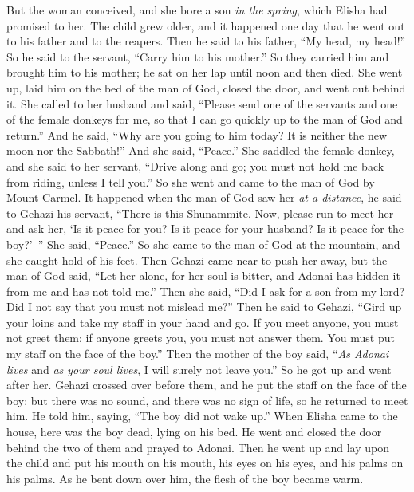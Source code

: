 \begin{biblechapter}
\verse But the woman conceived, and she bore a son \textit{in the spring}, which Elisha had promised to her.
 The child grew older, and it happened one day that he went out to his father and to the reapers.
\verse Then he said to his father, “My head, my head!” So he said to the servant, “Carry him to his mother.”
\verse So they carried him and brought him to his mother; he sat on her lap until noon and then died.
\verse She went up, laid him on the bed of the man of God, closed the door, and went out behind it.
\verse She called to her husband and said, “Please send one of the servants and one of the female donkeys for me, so that I can go quickly up to the man of God and return.”
\verse And he said, “Why are you going to him today? It is neither the new moon nor the Sabbath!” And she said, “Peace.”
\verse She saddled the female donkey, and she said to her servant, “Drive along and go; you must not hold me back from riding, unless I tell you.”
\verse So she went and came to the man of God by Mount Carmel. It happened when the man of God saw her \textit{at a distance}, he said to Gehazi his servant, “There is this Shunammite.
\verse Now, please run to meet her and ask her, ‘Is it peace for you? Is it peace for your husband? Is it peace for the boy?’ ” She said, “Peace.”
\verse So she came to the man of God at the mountain, and she caught hold of his feet. Then Gehazi came near to push her away, but the man of God said, “Let her alone, for her soul is bitter, and Adonai has hidden it from me and has not told me.”
\verse Then she said, “Did I ask for a son from my lord? Did I not say that you must not mislead me?”
\verse Then he said to Gehazi, “Gird up your loins and take my staff in your hand and go. If you meet anyone, you must not greet them; if anyone greets you, you must not answer them. You must put my staff on the face of the boy.”
\verse Then the mother of the boy said, “\textit{As Adonai lives} and \textit{as your soul lives}, I will surely not leave you.” So he got up and went after her.
\verse Gehazi crossed over before them, and he put the staff on the face of the boy; but there was no sound, and there was no sign of life, so he returned to meet him. He told him, saying, “The boy did not wake up.”
\verse When Elisha came to the house, here was the boy dead, lying on his bed.
\verse He went and closed the door behind the two of them and prayed to Adonai.
\verse Then he went up and lay upon the child and put his mouth on his mouth, his eyes on his eyes, and his palms on his palms. As he bent down over him, the flesh of the boy became warm.

\end{biblechapter}
